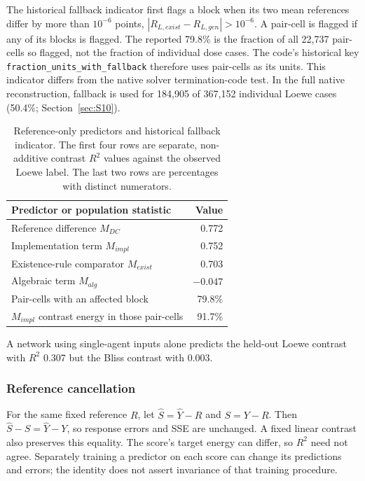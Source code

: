 \documentclass[11pt]{article}
\begin{document}
The historical fallback indicator first flags a block when its two mean references differ by more than $10^{-6}$ points, $|R_{L,exist}-R_{L,gen}|>10^{-6}$. A pair-cell is flagged if any of its blocks is flagged. The reported 79.8\% is the fraction of all 22,737 pair-cells so flagged, not the fraction of individual dose cases. The code's historical key \texttt{fraction\_units\_with\_fallback} therefore uses pair-cells as its units. This indicator differs from the native solver termination-code test. In the full native reconstruction, fallback is used for 184,905 of 367,152 individual Loewe cases (50.4\%; Section~\ref{sec:S10}).

\begin{table}[htbp]
\caption{Reference-only predictors and historical fallback indicator. The first four rows are separate, non-additive contrast $R^2$ values against the observed Loewe label. The last two rows are percentages with distinct numerators.}\label{tab:S9}
\centering\small
\begin{tabularx}{0.9\linewidth}{@{}L r@{}}
\toprule
Predictor or population statistic & Value \\
\midrule
Reference difference $M_{DC}$ & 0.772 \\
Implementation term $M_{impl}$ & 0.752 \\
Existence-rule comparator $M_{exist}$ & 0.703 \\
Algebraic term $M_{alg}$ & −0.047 \\
\midrule
Pair-cells with an affected block & 79.8\% \\
$M_{impl}$ contrast energy in those pair-cells & 91.7\% \\
\bottomrule
\end{tabularx}
\end{table}
A network using single-agent inputs alone predicts the held-out Loewe contrast with $R^2$ 0.307 but the Bliss contrast with 0.003.

\subsubsection*{Reference cancellation}
For the same fixed reference $R$, let $\hat S=\hat Y-R$ and $S=Y-R$. Then $\hat S-S=\hat Y-Y$, so response errors and SSE are unchanged. A fixed linear contrast also preserves this equality. The score's target energy can differ, so $R^2$ need not agree. Separately training a predictor on each score can change its predictions and errors; the identity does not assert invariance of that training procedure.
\end{document}
